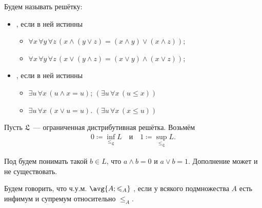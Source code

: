 \begin{definition*}
    Будем называть решётку:
    \begin{itemize}
        \item {}, если в ней истинны
            \begin{itemize}
                \item $\forall x\, \forall y\, \forall z\, (x \land (y \lor z) = (x \land y) \lor (x
                    \land z))$;
                \item $\forall x\, \forall y\, \forall z\, (x \lor (y \land z) = (x \lor y) \land (x \lor
                    z))$;
            \end{itemize}
        \item {}, если в ней истинны
            \begin{itemize}
                \item $\exists u\, \forall x\, (u \land x = u)$; \hfill $(\exists u\, \forall x\, (u \leq
                    x))$
                \item $\exists u\, \forall x\, (x \vee u = u)$. \hfill $(\exists u\, \forall x\, (x \leq
                    u))$
            \end{itemize}
    \end{itemize}

    Пусть $\mathfrak{L}$~--- ограниченная дистрибутивная решётка. Возьмём
    \begin{align*}
      0 \coloneqq \inf_{\leq_{\mathfrak{L}}} L \quad \text{и} \quad 1 \coloneqq
      \sup_{\leq_{\mathfrak{L}}} L.
    \end{align*}

    Под  будем понимать такой $b \in L$, что ${a \land b}
    = 0$ и ${a \lor b} = 1$. Дополнение может и не существовать.
\end{definition*}




\begin{definition*}
    Будем говорить, что ч.у.м. $\avg{A; \leqslant_A}$ , если у всякого
    подмножества $A$ есть инфимум и супремум относительно $\leq_A$.
\end{definition*}


